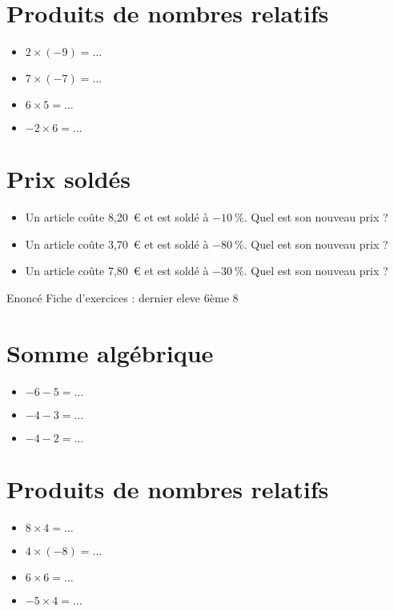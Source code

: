 \documentclass[a4paper,11pt,fleqn]{article}
\begin{document}
\section{Produits de nombres relatifs}
\begin{itemize}

  \item $2\times(-9)=\ldots$
  \item $7\times(-7)=\ldots$
  \item $6\times5=\ldots$
  \item $-2\times6=\ldots$
\end{itemize}


\section{Prix soldés}
\begin{itemize}

  \item Un article coûte 8,20~€ et est soldé à $-10~\%$. Quel est son nouveau prix ?
  \item Un article coûte 3,70~€ et est soldé à $-80~\%$. Quel est son nouveau prix ?
  \item Un article coûte 7,80~€ et est soldé à $-30~\%$. Quel est son nouveau prix ?
\end{itemize}
\newpage
\setcounter{exo}{0}
\setcounter{section}{0}
{Enoncé} \hfill {\huge Fiche d'exercices  : dernier eleve} \hfill {6ème 8}

\section{Somme algébrique}
\begin{itemize}

  \item $-6 -5=\ldots$
  \item $-4 -3=\ldots$
  \item $-4 -2=\ldots$
\end{itemize}


\section{Produits de nombres relatifs}
\begin{itemize}

  \item $8\times4=\ldots$
  \item $4\times(-8)=\ldots$
  \item $6\times6=\ldots$
  \item $-5\times4=\ldots$
\end{itemize}
\end{document}
